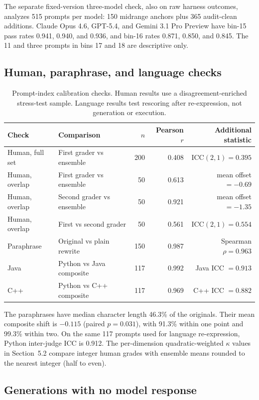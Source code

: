 \documentclass{article}
\begin{document}
The separate fixed-version three-model check, also on raw harness outcomes, analyzes 515 prompts per model: 150 midrange anchors plus 365 audit-clean additions. Claude Opus 4.6, GPT-5.4, and Gemini 3.1 Pro Preview have bin-15 pass rates 0.941, 0.940, and 0.936, and bin-16 rates 0.871, 0.850, and 0.845. The 11 and three prompts in bins 17 and 18 are descriptive only.

\subsection{Human, paraphrase, and language checks}

\begin{table}[h]
\centering
\caption{Prompt-index calibration checks. Human results use a disagreement-enriched stress-test sample. Language results test rescoring after re-expression, not generation or execution.}
\label{tab:measurement-checks}
\begin{tabular}{@{}llrrr@{}}
\toprule
Check & Comparison & $n$ & Pearson $r$ & Additional statistic \\
\midrule
Human, full set & First grader vs ensemble & 200 & 0.408 & ICC$(2,1)=0.395$ \\
Human, overlap & First grader vs ensemble & 50 & 0.613 & mean offset $=-0.69$ \\
Human, overlap & Second grader vs ensemble & 50 & 0.921 & mean offset $=-1.35$ \\
Human, overlap & First vs second grader & 50 & 0.561 & ICC$(2,1)=0.554$ \\
Paraphrase & Original vs plain rewrite & 150 & 0.987 & Spearman $\rho=0.963$ \\
Java & Python vs Java composite & 117 & 0.992 & Java ICC $=0.913$ \\
C++ & Python vs C++ composite & 117 & 0.969 & C++ ICC $=0.882$ \\
\bottomrule
\end{tabular}
\end{table}

The paraphrases have median character length 46.3\% of the originals. Their mean composite shift is $-0.115$ (paired $p=0.031$), with 91.3\% within one point and 99.3\% within two. On the same 117 prompts used for language re-expression, Python inter-judge ICC is 0.912. The per-dimension quadratic-weighted $\kappa$ values in Section~5.2 compare integer human grades with ensemble means rounded to the nearest integer (half to even).

\subsection{Generations with no model response}
\label{app:no-response}
\end{document}

